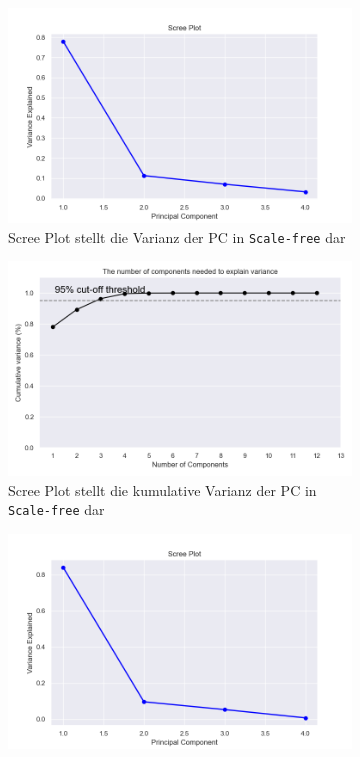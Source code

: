 \begin{figure}
    \begin{subfigure}{.5\textwidth}
        \includegraphics[width=\textwidth]{images/30_results/scalefree-scree.png}
        \caption{Scree Plot stellt die Varianz der PC in \texttt{Scale-free} dar}
        \label{fig:scree-scalefree}
    \end{subfigure}%
    \begin{subfigure}{.5\textwidth}
        \includegraphics[width=\textwidth]{images/30_results/scalefree-scree-cum.png}
        \caption{Scree Plot stellt die kumulative Varianz der PC in \texttt{Scale-free} dar}
        \label{fig:scree-cum-scalefree}
    \end{subfigure}
    \ContinuedFloat
    \begin{subfigure}{.5\textwidth}
        \includegraphics[width=\textwidth]{images/30_results/complete-scree.png}

\end{subfigure}
\end{figure}

